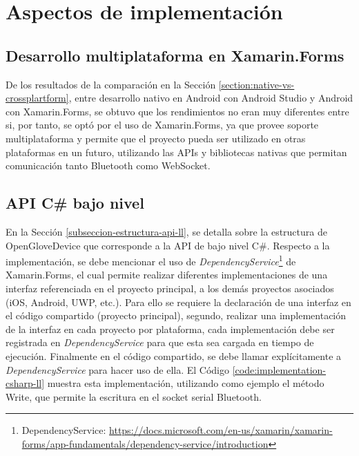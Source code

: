 \section{Aspectos de implementación}


\subsection{Desarrollo multiplataforma en Xamarin.Forms}
De los resultados de la comparación en la Sección \ref{section:native-vs-crossplartform}, entre desarrollo nativo en Android con Android Studio y  Android con Xamarin.Forms, se obtuvo que los rendimientos no eran muy diferentes entre si, por tanto, se optó por el uso de Xamarin.Forms, ya que provee soporte multiplataforma y permite que el proyecto pueda ser utilizado en otras plataformas en un futuro, utilizando las APIs y bibliotecas nativas que permitan comunicación tanto Bluetooth como WebSocket.




\subsection{API C\# bajo nivel}
En la Sección \ref{subseccion-estructura-api-ll}, se detalla sobre la estructura de OpenGloveDevice que corresponde a la API de bajo nivel C\#. Respecto a la implementación, se debe mencionar el uso de \textit{DependencyService}\footnote{DependencyService: \url{https://docs.microsoft.com/en-us/xamarin/xamarin-forms/app-fundamentals/dependency-service/introduction}} de Xamarin.Forms, el cual permite realizar diferentes implementaciones de una interfaz referenciada en el proyecto principal, a los demás proyectos asociados (iOS, Android, UWP, etc.). Para ello se requiere la declaración de una interfaz en el código compartido (proyecto principal), segundo, realizar una implementación de la interfaz en cada proyecto por plataforma, cada implementación debe ser registrada en \textit{DependencyService} para que esta sea cargada en tiempo de ejecución. Finalmente en el código compartido, se debe llamar explícitamente a \textit{DependencyService} para hacer uso de ella. El Código \ref{code:implementation-csharp-ll} muestra esta implementación, utilizando como ejemplo el método Write, que permite la escritura  en el socket serial Bluetooth.


